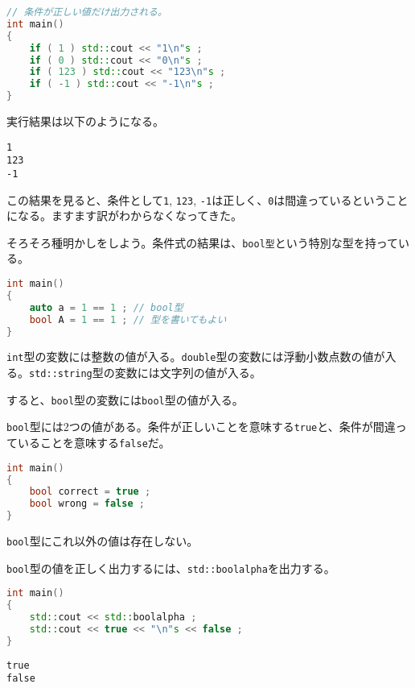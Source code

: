 \ifTombow\pagebreak\fi
\begin{lstlisting}[language={C++}]
// 条件が正しい値だけ出力される。
int main()
{
    if ( 1 ) std::cout << "1\n"s ;
    if ( 0 ) std::cout << "0\n"s ;
    if ( 123 ) std::cout << "123\n"s ;
    if ( -1 ) std::cout << "-1\n"s ;
}
\end{lstlisting}

実行結果は以下のようになる。

\begin{lstlisting}[style=terminal]
1
123
-1
\end{lstlisting}

この結果を見ると、条件として\texttt{1}, \texttt{123}, \texttt{-1}は正しく、\texttt{0}は間違っているということになる。ますます訳がわからなくなってきた。


そろそろ種明かしをしよう。条件式の結果は、\texttt{bool型}という特別な型を持っている。

\begin{lstlisting}[language={C++}]
int main()
{
    auto a = 1 == 1 ; // bool型
    bool A = 1 == 1 ; // 型を書いてもよい
}
\end{lstlisting}

\texttt{int}型の変数には整数の値が入る。\texttt{double}型の変数には浮動小数点数の値が入る。\texttt{std::string}型の変数には文字列の値が入る。

すると、\texttt{bool}型の変数には\texttt{bool}型の値が入る。

\texttt{bool}型には2つの値がある。条件が正しいことを意味する\texttt{true}と、条件が間違っていることを意味する\texttt{false}だ。

\begin{lstlisting}[language={C++}]
int main()
{
    bool correct = true ;
    bool wrong = false ;
}
\end{lstlisting}

\texttt{bool}型にこれ以外の値は存在しない。

\texttt{bool}型の値を正しく出力するには、\texttt{std::boolalpha}を出力する。

\begin{lstlisting}[language={C++}]
int main()
{
    std::cout << std::boolalpha ;
    std::cout << true << "\n"s << false ;
}
\end{lstlisting}

\begin{lstlisting}[style=terminal]
true
false
\end{lstlisting}

